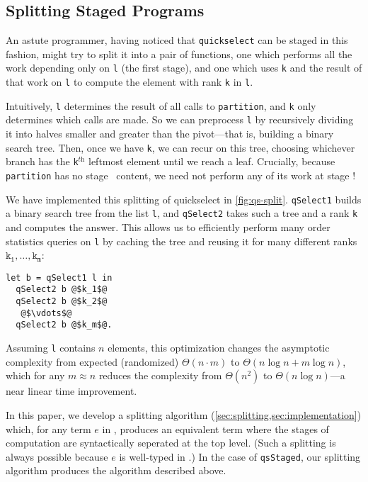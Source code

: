 \begin{abstrsyn}
\subsection{Splitting Staged Programs}



An astute programmer, having noticed that \texttt{quickselect} can be staged in
this fashion, might try to split it into a pair of functions, one which performs
all the work depending only on \texttt{l} (the first stage), and one which uses
\texttt{k} and the result of that work on \texttt{l} to compute the element with
rank \texttt{k} in \texttt{l}. 

Intuitively, \texttt{l} determines the result of all calls to
\texttt{partition}, and \texttt{k} only determines which calls are made. So we
can preprocess \texttt{l} by recursively dividing it into halves smaller and
greater than the pivot---that is, building a binary search tree. Then, once we
have \texttt{k}, we can recur on this tree, choosing whichever branch has the
\texttt{k}${}^\textit{th}$ leftmost element until we reach a leaf. Crucially,
because \texttt{partition} has no stage \bbtwo\ content, we need not perform any
of its work at stage \bbtwo!


We have implemented this splitting of quickselect in \ref{fig:qs-split}.
\texttt{qSelect1} builds a binary search tree from the list \texttt{l}, and
\texttt{qSelect2} takes such a tree and a rank \texttt{k} and computes the
answer. This allows us to efficiently perform many order statistics queries on
\texttt{l} by caching the tree and reusing it for many different ranks
$\mathtt{k_1},\dots,\mathtt{k_m}$:
%
\begin{lstlisting}
let b = qSelect1 l in
  qSelect2 b @$k_1$@
  qSelect2 b @$k_2$@
   @$\vdots$@ 
  qSelect2 b @$k_m$@.
\end{lstlisting}

Assuming \texttt{l} contains $n$ elements, this optimization changes the
asymptotic complexity from expected (randomized) $\Theta(n \cdot m)$ to
$\Theta(n\log{n} + m\log{n})$, which for any $m \approx n$ reduces the
complexity from $\Theta (n^2)$ to $\Theta(n\log{n})$---a near linear time
improvement. 

In this paper, we develop a splitting algorithm
(\ref{sec:splitting,sec:implementation}) which, for any term $e$ in \lang,
produces an equivalent term where the stages of computation 
are syntactically seperated at the top level.
(Such a splitting is always possible because $e$ is well-typed in \lang.) In the
case of \texttt{qsStaged}, our splitting algorithm produces the algorithm
described above.


\end{abstrsyn}
